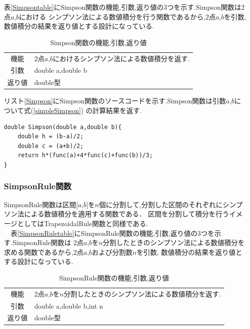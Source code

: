 \documentclass[dvipdfmx]{jarticle}
\begin{document}
    表\ref{Simpsontable}にSimpson関数の機能,引数,返り値の3つを示す.Simpson関数は2点$a$,$b$における
    シンプソン法による数値積分を行う関数であるから,2点$a$,$b$を引数,数値積分の結果を返り値とする設計になっている.
    \begin{table}[H]
      \caption{Simpson関数の機能,引数,返り値}
      \label{SimpsonTtable}
      \begin{center}
          \begin{tabular}{c|l}\hline
        機能 & 2点$a$,$b$におけるシンプソン法による数値積分を返す.\\
        引数 & double a,double b\\
        返り値 & double型 \\ \hline
          \end{tabular}
      \end{center}
      \end{table}

      リスト\ref{Simpson}にSimpson関数のソースコードを示す.Simpson関数は引数$a$,$b$について式(\ref{simpleSimpson})
      の計算結果を返す.
      \begin{lstlisting}[basicstyle=\ttfamily\footnotesize, frame=single,label=Simpson,caption=Simpson関数]
double Simpson(double a,double b){
    double h = (b-a)/2;
    double c = (a+b)/2;
    return h*(func(a)+4*func(c)+func(b))/3;
}
      \end{lstlisting}

    \subsubsection{SimpsonRule関数}
    SimpsonRule関数は区間[$a$,$b$]を$n$個に分割して,分割した区間のそれぞれにシンプソン法による数値積分を適用する関数である．
    区間を分割して積分を行うイメージとしてはTrapezoidalRule関数と同様である.\\

    　表\ref{SimpsonRuletable}にSimpsonRule関数の機能,引数,返り値の3つを示す.SimpsonRule関数は
    2点$a$,$b$を$n$分割したときのシンプソン法による数値積分を求める関数であるから,2点$a$,$b$および分割数$n$を引数,
    数値積分の結果を返り値とする設計になっている.

    \begin{table}[H]
      \caption{SimpsonRule関数の機能,引数,返り値}
      \label{SimpsonRuleTtable}
      \begin{center}
          \begin{tabular}{c|l}\hline
        機能 & 2点$a$,$b$を$n$分割したときのシンプソン法による数値積分を返す.\\
        引数 & double a,double b,int n\\
        返り値 & double型 \\ \hline
          \end{tabular}
      \end{center}
      \end{table}
\end{document}
